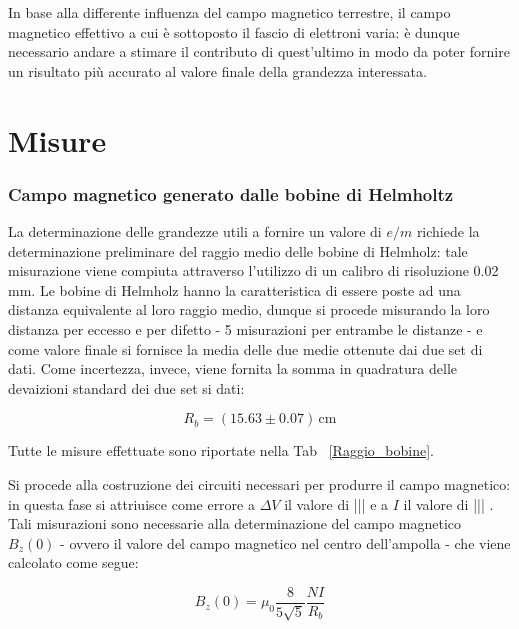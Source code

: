 \documentclass[]{article}
\let\oldsection\section%
\renewcommand{\section}{%
	\renewcommand{\theequation}{\thesection.\arabic{equation}}%
	\oldsection}%
\begin{document}
    In base alla differente influenza del campo magnetico terrestre, il campo magnetico effettivo a cui è sottoposto il fascio di elettroni varia: è dunque necessario andare a stimare il contributo di quest'ultimo in modo da poter fornire un risultato più accurato al valore finale della grandezza interessata.

    \section{Misure}

    \subsubsection{Campo magnetico generato dalle bobine di Helmholtz}

    La determinazione delle grandezze utili a fornire un valore di $e/m$ richiede la determinazione preliminare del raggio medio delle bobine di Helmholz: tale misurazione viene compiuta attraverso l'utilizzo di un calibro di risoluzione 0.02 mm. Le bobine di Helmholz hanno la caratteristica di essere poste ad una distanza equivalente al loro raggio medio, dunque si procede misurando la loro distanza per eccesso e per difetto - 5 misurazioni per entrambe le distanze - e come valore finale si fornisce la media delle due medie ottenute dai due set di dati. Come incertezza, invece, viene fornita la somma in quadratura delle devaizioni standard dei due set si dati:

    \begin{equation}
        \label{misura_Rb}
        R_b = (15.63 \pm 0.07) \, \text{cm}
    \end{equation} 

    Tutte le misure effettuate sono riportate nella Tab ~\ref{Raggio_bobine}.

    Si procede alla costruzione dei circuiti necessari per produrre il campo magnetico: in questa fase si attriuisce come errore a $\Delta V $ il valore di ||| e a $ I $ il valore di ||| . %
    Tali misurazioni sono necessarie alla determinazione del campo magnetico $B_z(0)$ - ovvero il valore del campo magnetico nel centro dell'ampolla - che viene calcolato come segue:

    \begin{equation}
        \label{B_z0}
        B_z (0) = \mu _0 \frac{8}{5\sqrt{5}} \frac{NI}{R_b}
    \end{equation} 
\end{document}

